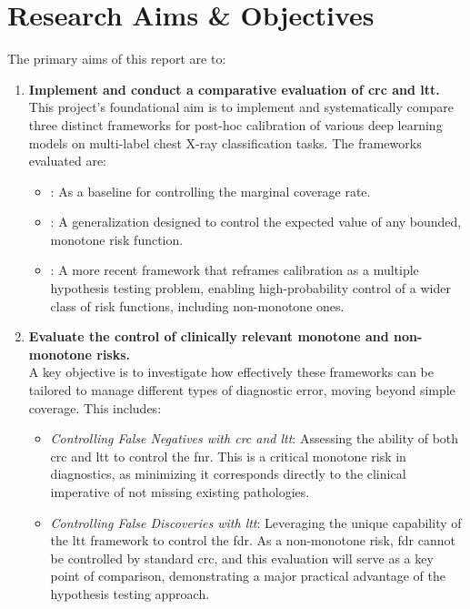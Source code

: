 \section{Research Aims \& Objectives}
\label{sec:aims-objectives}

The primary aims of this report are to:

\begin{enumerate}
    \item \textbf{Implement and conduct a comparative evaluation of \gls{crc} and \gls{ltt}.} \\
    This project's foundational aim is to implement and systematically compare
    three distinct frameworks for post-hoc calibration of various deep learning models
    on multi-label chest X-ray classification tasks.
    The frameworks evaluated are:
    \begin{itemize}
        \item \emph{}:
        As a baseline for controlling the marginal coverage rate.
        \item \emph{}:
        A generalization designed to control the expected value of any bounded, monotone risk function.
        \item \emph{}:
        A more recent framework that reframes calibration as a multiple hypothesis testing problem,
        enabling high-probability control of a wider class of risk functions, including non-monotone ones.
    \end{itemize}

    \item \textbf{Evaluate the control of clinically relevant monotone and non-monotone risks.} \\
    A key objective is to investigate how effectively these frameworks can be tailored
    to manage different types of diagnostic error, moving beyond simple coverage.
    This includes:
    \begin{itemize}
        \item \emph{Controlling False Negatives with \gls{crc} and \gls{ltt}}:
        Assessing the ability of both \gls{crc} and \gls{ltt} to control the \gls{fnr}.
        This is a critical monotone risk in diagnostics,
        as minimizing it corresponds directly to the clinical imperative of not missing existing pathologies.
        \item \emph{Controlling False Discoveries with \gls{ltt}}:
        Leveraging the unique capability of the \gls{ltt} framework to control the \gls{fdr}.
        As a non-monotone risk, \gls{fdr} cannot be controlled by standard \gls{crc},
        and this evaluation will serve as a key point of comparison,
        demonstrating a major practical advantage of the hypothesis testing approach.
    \end{itemize}



\end{enumerate}
